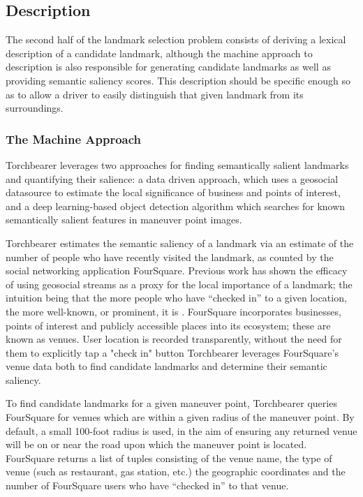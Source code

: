 \subsection{Description}
The second half of the landmark selection problem consists of deriving a lexical description of a candidate landmark, although the machine approach to description is also responsible for generating candidate landmarks as well as providing semantic saliency scores. This description should be specific enough so as to allow a driver to easily distinguish that given landmark from its surroundings.

\subsubsection{The Machine Approach}
Torchbearer leverages two approaches for finding semantically salient landmarks and quantifying their salience: a data driven approach, which uses a geosocial datasource to estimate the local significance of business and points of interest, and a deep learning-based object detection algorithm which searches for known semantically salient features in maneuver point images.
	
Torchbearer estimates the semantic saliency of a landmark via an estimate of the number of people who have recently visited the landmark, as counted by the social networking application FourSquare. Previous work has shown the efficacy of using geosocial streams as a proxy for the local importance of a landmark; the intuition being that the more people who have “checked in” to a given location, the more well-known, or prominent, it is \cite{quesnot2014measure}. FourSquare incorporates businesses, points of interest and publicly accessible places into its ecosystem; these are known as venues. User location is recorded transparently, without the need for them to explicitly tap a "check in" button Torchbearer leverages FourSquare’s venue data both to find candidate landmarks and determine their semantic saliency. 

To find candidate landmarks for a given maneuver point, Torchbearer queries FourSquare for venues which are within a given radius of the maneuver point. By default, a small 100-foot radius is used, in the aim of ensuring any returned venue will be on or near the road upon which the maneuver point is located. FourSquare returns a list of tuples consisting of the venue name, the type of venue (such as restaurant, gas station, etc.) the geographic coordinates and the number of FourSquare users who have “checked in” to that venue. 

